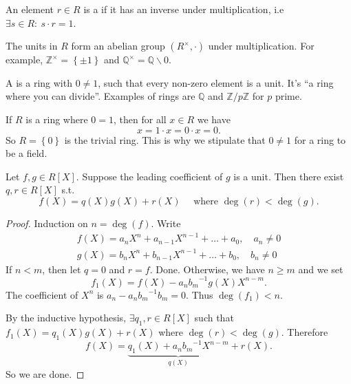 \documentclass[egregdoesnotlikesansseriftitles,a4paper]{scrartcl}
\begin{document}
\begin{definition*}[Unit]
       An element $r \in R$ is a  if it has an inverse under multiplication, i.e $\exists s \in R: \ s \cdot r=1$.

       The units in $R$ form an abelian group $(R^{\times},\cdot )$ under multiplication. For example, $\mathbb{Z}^{\times}=\left\{\pm 1\right\}$ and $\mathbb{Q}^{\times}=\mathbb{Q}\backslash 0$. 
\end{definition*}
\begin{definition*}[Field]
       A  is a ring with $0 \neq 1$, such that every non-zero element is a unit. It's ``a ring where you can divide''. Examples of rings are $\mathbb{Q} $ and $\mathbb{Z}/p\mathbb{Z}$ for $p$ prime.
\end{definition*}
\begin{remark}
       If $R$ is a ring where $0=1$, then for all $x \in R$ we have \[
       x=1 \cdot x =0 \cdot x=0
       .\] So $R=\left\{0\right\}$ is the trivial ring. This is why we stipulate that $0 \neq 1$ for a ring to be a field.
\end{remark}
\begin{proposition}\label{euclidrings}
       Let $f,g \in R[X]$. Suppose the leading coefficient of $g$ is a unit. Then there exist $q, r \in R[X]$ s.t. \[
       f (X)=q (X)g (X)+r (X) \quad \text{ where } \operatorname{deg}(r) < \operatorname{deg}(g)
       .\] 
\end{proposition}
\begin{proof}
       Induction on $n=\operatorname{deg}(f)$. Write \begin{align*}
             f (X)= a_{n}X^{n}+a_{n-1}X^{n-1}+ \ldots +a_0 , \quad a_{n}\neq 0\\
             g (X)= b_{n}X^{n}+b_{n-1}X^{n-1}+ \ldots +b_0 , \quad b_{n}\neq 0
       \end{align*}
       If $n<m$, then let $q=0$ and $r=f$. Done. Otherwise, we have $n \geq m$ and we set \[
       f_1 (X)= f (X)-a_{n} {b_{m}}^{-1} g (X) X ^{n-m}
       .\] The coefficient of $X^{n}$ is $a_{n}-a_{n}{b_{m}}^{-1}b_{m}=0$. Thus  $\operatorname{deg}(f_{1})<n$. 
       
       By the inductive hypothesis, $\exists q_1 ,r \in R[X]$ such that $f_1 (X)=q_1 (X)g (X)+r (X)$ where $\operatorname{deg}(r) < \operatorname{deg}(g)$. Therefore \[
       f (X)=\underbrace{q_1 (X)+a_n {b_{m}}^{-1} X ^{n-m}}_{q (X)}+r (X) 
       .\] So we are done. 
\end{proof}
\end{document}
